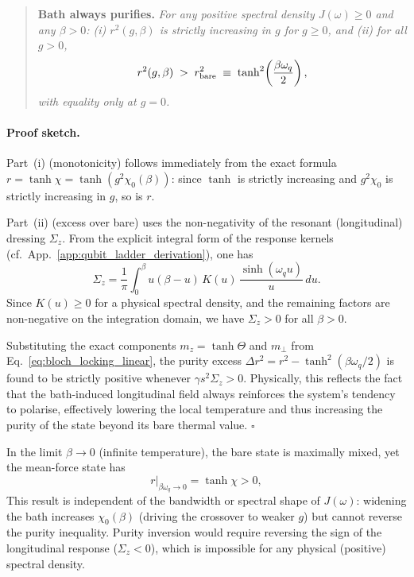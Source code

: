 \begin{quote}
\textbf{Bath always purifies.}\; \textit{For any positive spectral density
$J(\omega)\geq 0$ and any $\beta>0$: (i) $r^2(g,\beta)$ is strictly increasing
in $g$ for $g\geq 0$, and (ii) for all $g>0$,}
\begin{equation}
    r^2(g,\beta) \;>\; r_{\rm bare}^2 \;\equiv\; \tanh^2\!\left(\frac{\beta\omega_q}{2}\right),
    \label{eq:purity_bound}
\end{equation}
\textit{with equality only at $g=0$.}
\end{quote}

\paragraph{Proof sketch.}
Part~(i) (monotonicity) follows immediately from the exact formula $r =
\tanh\chi = \tanh(g^2\chi_0(\beta))$: since $\tanh$ is strictly increasing and
$g^2\chi_0$ is strictly increasing in $g$, so is $r$.

Part~(ii) (excess over bare) uses the non-negativity of the resonant (longitudinal) dressing $\Sigma_z$. From the explicit integral form of the response kernels (cf.\ App.~\ref{app:qubit_ladder_derivation}), one has
\begin{equation}
    \Sigma_z = \frac{1}{\pi}\int_0^\beta u(\beta-u)\,K(u)\,\frac{\sinh(\omega_q u)}{u}\,du.
\end{equation}
Since $K(u)\geq 0$ for a physical spectral density, and the remaining factors are non-negative on the integration domain, we have $\Sigma_z > 0$ for all $\beta>0$. 

Substituting the exact components $m_z = \tanh \Theta$ and $m_\perp$ from Eq.~\eqref{eq:bloch_locking_linear}, the purity excess $\Delta r^2 = r^2 - \tanh^2(\beta\omega_q/2)$ is found to be strictly positive whenever $\gamma s^2 \Sigma_z > 0$. Physically, this reflects the fact that the bath-induced longitudinal field always reinforces the system's tendency to polarise, effectively lowering the local temperature and thus increasing the purity of the state beyond its bare thermal value. $\square$

In the limit $\beta\to 0$ (infinite temperature), the bare state is maximally mixed, yet the
mean-force state has
\begin{equation}
    r\big|_{\beta\omega_q\to 0} = \tanh\chi > 0,
    \label{eq:purity_highT}
\end{equation}
This result is independent of the bandwidth or spectral shape of $J(\omega)$:
widening the bath increases $\chi_0(\beta)$ (driving the crossover to weaker
$g$) but cannot reverse the purity inequality.  Purity inversion would require
reversing the sign of the longitudinal response ($\Sigma_z < 0$), which is impossible for
any physical (positive) spectral density. 

